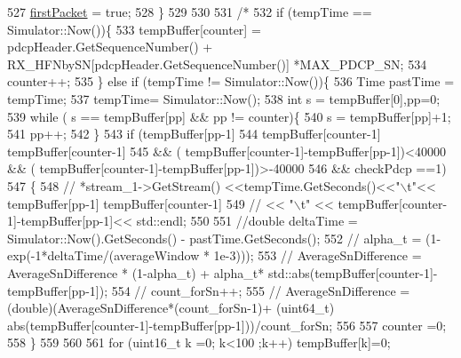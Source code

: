 \begin{DoxyCode}
{527         \hyperlink{classns3_1_1McUePdcp_a3104c310714ad1057de6591d73362ff7}{firstPacket} = \textcolor{keyword}{true};
528     \}
529 
530 
531 \textcolor{comment}{/*}
532 \textcolor{comment}{  if (tempTime == Simulator::Now())\{}
533 \textcolor{comment}{          tempBuffer[counter] = pdcpHeader.GetSequenceNumber() + RX\_HFNbySN[pdcpHeader.GetSequenceNumber()]
      *MAX\_PDCP\_SN;}
534 \textcolor{comment}{          counter++;}
535 \textcolor{comment}{  \} else if (tempTime != Simulator::Now())\{}
536 \textcolor{comment}{          Time pastTime = tempTime;}
537 \textcolor{comment}{        tempTime= Simulator::Now();}
538 \textcolor{comment}{          int s = tempBuffer[0],pp=0;}
539 \textcolor{comment}{          while ( s == tempBuffer[pp] && pp != counter)\{}
540 \textcolor{comment}{                  s = tempBuffer[pp]+1;}
541 \textcolor{comment}{                  pp++;}
542 \textcolor{comment}{          \}}
543 \textcolor{comment}{          if (tempBuffer[pp-1] %
544 \textcolor{comment}{                          tempBuffer[counter-1] %
       tempBuffer[counter-1]%
545 \textcolor{comment}{                          && ( tempBuffer[counter-1]-tempBuffer[pp-1])<40000 && (
       tempBuffer[counter-1]-tempBuffer[pp-1])>-40000}
546 \textcolor{comment}{                          && checkPdcp ==1)}
547 \textcolor{comment}{          \{}
548 \textcolor{comment}{        //  *stream\_1->GetStream() <<tempTime.GetSeconds()<<"\(\backslash\)t"<< tempBuffer[pp-1]%
       tempBuffer[counter-1]%
549 \textcolor{comment}{                //        << "\(\backslash\)t" << tempBuffer[counter-1]-tempBuffer[pp-1]<< std::endl;}
550 \textcolor{comment}{}
551 \textcolor{comment}{        //double deltaTime = Simulator::Now().GetSeconds() - pastTime.GetSeconds();}
552 \textcolor{comment}{        //        alpha\_t = (1-exp(-1*deltaTime/(averageWindow * 1e-3)));}
553 \textcolor{comment}{                //  AverageSnDifference = AverageSnDifference * (1-alpha\_t) + alpha\_t*
       std::abs(tempBuffer[counter-1]-tempBuffer[pp-1]);}
554 \textcolor{comment}{//      count\_forSn++;}
555 \textcolor{comment}{//      AverageSnDifference = (double)(AverageSnDifference*(count\_forSn-1)+ (uint64\_t)
       abs(tempBuffer[counter-1]-tempBuffer[pp-1]))/count\_forSn;}
556 \textcolor{comment}{}
557 \textcolor{comment}{        counter =0;}
558 \textcolor{comment}{          \}}
559 \textcolor{comment}{}
560 \textcolor{comment}{}
561 \textcolor{comment}{            for (uint16\_t k =0; k<100 ;k++) tempBuffer[k]=0;}
}}}}
\end{DoxyCode}
